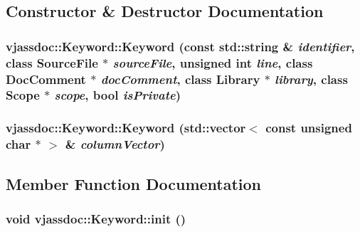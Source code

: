 \subsection{Constructor \& Destructor Documentation}
\hypertarget{classvjassdoc_1_1Keyword_f9216d9602f71a8b10d25d6c61412fc2}{
\subsubsection{\setlength{\rightskip}{0pt plus 5cm}vjassdoc::Keyword::Keyword (const std::string \& {\em identifier}, class {\bf SourceFile} $\ast$ {\em sourceFile}, unsigned int {\em line}, class {\bf DocComment} $\ast$ {\em docComment}, class {\bf Library} $\ast$ {\em library}, class {\bf Scope} $\ast$ {\em scope}, bool {\em isPrivate})}}
\label{classvjassdoc_1_1Keyword_f9216d9602f71a8b10d25d6c61412fc2}


\hypertarget{classvjassdoc_1_1Keyword_b12dde7146b5bb943108d520599d988d}{
\subsubsection{\setlength{\rightskip}{0pt plus 5cm}vjassdoc::Keyword::Keyword (std::vector$<$ const unsigned char $\ast$ $>$ \& {\em columnVector})}}
\label{classvjassdoc_1_1Keyword_b12dde7146b5bb943108d520599d988d}




\subsection{Member Function Documentation}
\hypertarget{classvjassdoc_1_1Keyword_0aeec733c7c55ff51c8b1ba58af18ed9}{
\subsubsection{\setlength{\rightskip}{0pt plus 5cm}void vjassdoc::Keyword::init ()}}
\label{classvjassdoc_1_1Keyword_0aeec733c7c55ff51c8b1ba58af18ed9}




